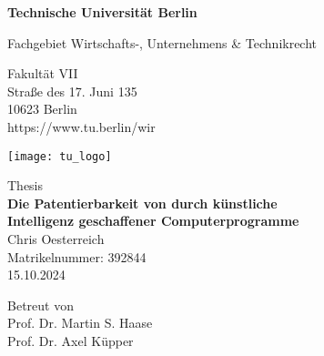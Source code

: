 \thispagestyle{empty}
\begin{center}

\vspace*{1.4cm}
{\LARGE \textbf{Technische Universität Berlin}}

\vspace{0.5cm}

{\large Fachgebiet Wirtschafts-, Unternehmens \& Technikrecht\\[1mm]}

Fakultät VII\\
Straße des 17. Juni 135\\
10623 Berlin\\
https://www.tu.berlin/wir\\

\vspace*{1cm}

\texttt{[image: tu\_logo]}

\vspace*{1.0cm}

{\LARGE Thesis}\\

\vspace{1.0cm}
{\LARGE \textbf{Die Patentierbarkeit von durch künstliche }}\\
\vspace*{0.3cm}
{\LARGE \textbf{Intelligenz geschaffener Computerprogramme}}\\
\vspace*{1.0cm}
{\LARGE Chris Oesterreich}
\\
\vspace*{0.5cm}
Matrikelnummer: 392844\\
15.10.2024\\ %
\vspace*{1.0cm}

Betreut von\\
Prof. Dr. Martin S. Haase\\
Prof. Dr. Axel Küpper


\end{center}

